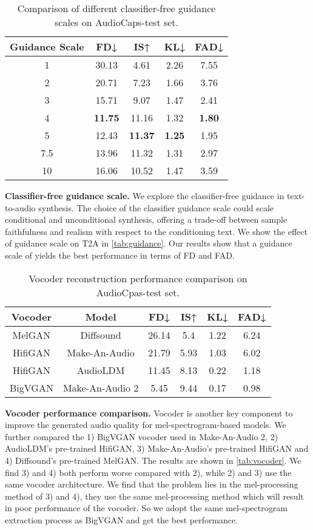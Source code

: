 \documentclass{article}
\begin{document}
\begin{table}[!h]\centering
\small
\caption{Comparison of different classifier-free guidance scales on AudioCaps-test set.}
\label{tab:guidance}\begin{tabular}{ccccc}
\toprule
Guidance Scale & FD↓    & IS↑    & KL↓    & FAD↓ \\
\midrule
1      & 30.13  & 4.61   & 2.26   & 7.55 \\
2      & 20.71  & 7.23   & 1.66   & 3.76 \\
3      & 15.71  & 9.07   & 1.47   & 2.41 \\
4      & \textbf{11.75}  & 11.16  & 1.32   & \textbf{1.80} \\
5      & 12.43  & \textbf{11.37}  & \textbf{1.25}   & 1.95 \\
7.5    & 13.96  & 11.32  & 1.31   & 2.97 \\
10     & 16.06  & 10.52  & 1.47   & 3.59 \\
\bottomrule
\end{tabular}\end{table}

\textbf{Classifier-free guidance scale.}
We explore the classifier-free guidance in text-to-audio synthesis. The choice of the classifier guidance scale could scale conditional and unconditional synthesis, offering a trade-off between sample faithfulness and realism with respect to the conditioning text. We show the effect of guidance scale  on T2A in \autoref{tab:guidance}. Our results show that a guidance scale of  yields the best performance in terms of FD and FAD.


\begin{table}[!h]
\centering
\small
\caption{Vocoder reconstruction performance comparison on AudioCpas-test set. }
\begin{tabular}{cccccc}
\toprule
  Vocoder  & Model    & FD↓    & IS↑    & KL↓    & FAD↓ \\
\midrule
MelGAN  &  Diffsound & 26.14  & 5.4    & 1.22   & 6.24 \\
HifiGAN  &  Make-An-Audio & 21.79  & 5.93   & 1.03   & 6.02 \\
HifiGAN  &  AudioLDM & 11.45  & 8.13   & 0.22   & 1.18 \\
BigVGAN & Make-An-Audio 2 & 5.45   & 9.44   & 0.17   & 0.98 \\
\bottomrule
\end{tabular}\label{tab:vocoder}
\end{table}


\textbf{Vocoder performance comparison.}
\label{vocoder_comp}
Vocoder is another key component to improve the generated audio quality for mel-spectrogram-based models. We further compared the 1) BigVGAN vocoder used in Make-An-Audio 2, 2) AudioLDM's pre-trained HifiGAN, 3) Make-An-Audio's pre-trained HifiGAN and 4) Diffsound's pre-trained MelGAN. The results are shown in \autoref{tab:vocoder}. We find 3) and 4) both perform worse compared with 2), while 2) and 3) use the same vocoder architecture. We find that the problem lies in the mel-processing method of 3) and 4), they use the same mel-processing method which will result in poor performance of the vocoder. So we adopt the same mel-spectrogram extraction process as BigVGAN and get the best performance.
\end{document}
